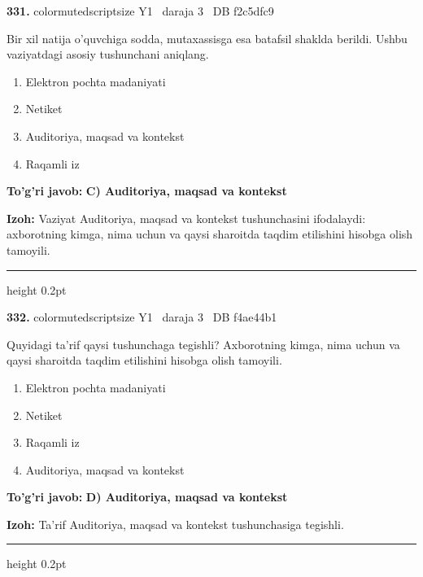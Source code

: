 \documentclass[10pt,a4paper,oneside]{article}
\begin{document}
\noindent\textbf{\color{ink}331.}  {color{muted}scriptsize Y1 \textbullet\ daraja 3 \textbullet\ DB f2c5dfc9}
\par
Bir xil natija o'quvchiga sodda, mutaxassisga esa batafsil shaklda berildi. Ushbu vaziyatdagi asosiy tushunchani aniqlang.
\begin{enumerate}[label=\Alph*),leftmargin=9mm]
\item Elektron pochta madaniyati
\item Netiket
\item Auditoriya, maqsad va kontekst
\item Raqamli iz
\end{enumerate}
\begin{tcolorbox}[enhanced,breakable,colback=teal!4,colframe=teal!50!black,boxrule=0.5pt,arc=1.1mm,left=3mm,right=3mm,top=1.7mm,bottom=1.7mm,before skip=2mm,after skip=2mm]
\textbf{\color{teal}To'g'ri javob:} \textbf{C) Auditoriya, maqsad va kontekst}
\par\smallskip
\textbf{Izoh:} Vaziyat Auditoriya, maqsad va kontekst tushunchasini ifodalaydi: axborotning kimga, nima uchun va qaysi sharoitda taqdim etilishini hisobga olish tamoyili.
\end{tcolorbox}
\vspace{2mm}\hrule height 0.2pt \vspace{3mm}

\noindent\textbf{\color{ink}332.}  {color{muted}scriptsize Y1 \textbullet\ daraja 3 \textbullet\ DB f4ae44b1}
\par
Quyidagi ta'rif qaysi tushunchaga tegishli? Axborotning kimga, nima uchun va qaysi sharoitda taqdim etilishini hisobga olish tamoyili.
\begin{enumerate}[label=\Alph*),leftmargin=9mm]
\item Elektron pochta madaniyati
\item Netiket
\item Raqamli iz
\item Auditoriya, maqsad va kontekst
\end{enumerate}
\begin{tcolorbox}[enhanced,breakable,colback=teal!4,colframe=teal!50!black,boxrule=0.5pt,arc=1.1mm,left=3mm,right=3mm,top=1.7mm,bottom=1.7mm,before skip=2mm,after skip=2mm]
\textbf{\color{teal}To'g'ri javob:} \textbf{D) Auditoriya, maqsad va kontekst}
\par\smallskip
\textbf{Izoh:} Ta'rif Auditoriya, maqsad va kontekst tushunchasiga tegishli.
\end{tcolorbox}
\vspace{2mm}\hrule height 0.2pt \vspace{3mm}
\end{document}
